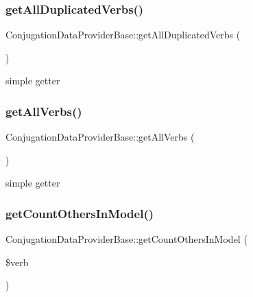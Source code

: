 \subsubsection{\texorpdfstring{get\+All\+Duplicated\+Verbs()}{getAllDuplicatedVerbs()}}
{\footnotesize\ttfamily Conjugation\+Data\+Provider\+Base\+::get\+All\+Duplicated\+Verbs (\begin{DoxyParamCaption}{ }\end{DoxyParamCaption})\hspace{0.3cm}{\ttfamily [abstract]}}

simple getter \hypertarget{classConjugationDataProviderBase_af3d127433543eb86878447357d6382d4}{}\label{classConjugationDataProviderBase_af3d127433543eb86878447357d6382d4} 
\subsubsection{\texorpdfstring{get\+All\+Verbs()}{getAllVerbs()}}
{\footnotesize\ttfamily Conjugation\+Data\+Provider\+Base\+::get\+All\+Verbs (\begin{DoxyParamCaption}{ }\end{DoxyParamCaption})\hspace{0.3cm}{\ttfamily [abstract]}}

simple getter \hypertarget{classConjugationDataProviderBase_a155bfe75cdc9224801c2704540205650}{}\label{classConjugationDataProviderBase_a155bfe75cdc9224801c2704540205650} 
\subsubsection{\texorpdfstring{get\+Count\+Others\+In\+Model()}{getCountOthersInModel()}}
{\footnotesize\ttfamily Conjugation\+Data\+Provider\+Base\+::get\+Count\+Others\+In\+Model (\begin{DoxyParamCaption}\item[{}]{\$verb }\end{DoxyParamCaption})\hspace{0.3cm}{\ttfamily [abstract]}}

